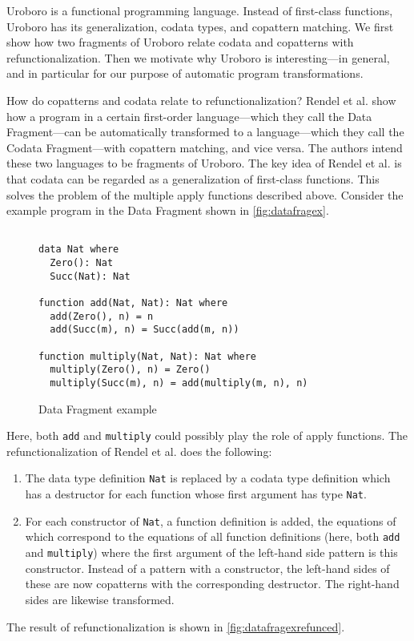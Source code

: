 Uroboro is a functional programming language. Instead of first-class functions, Uroboro has its generalization, codata types, and copattern matching. We first show how two fragments of Uroboro relate codata and copatterns with refunctionalization. Then we motivate why Uroboro is interesting---in general, and in particular for our purpose of automatic program transformations.

How do copatterns and codata relate to refunctionalization? Rendel et al.\cite{rendel15automatic} show how a program in a certain first-order language---which they call the Data Fragment---can be automatically transformed to a language---which they call the Codata Fragment---with copattern matching, and vice versa. The authors intend these two languages to be fragments of Uroboro. The key idea of Rendel et al. is that codata can be regarded as a generalization of first-class functions. This solves the problem of the multiple apply functions described above. Consider the example program in the Data Fragment shown in \autoref{fig:datafragex}.

\begin{figure}
\begin{lstlisting}

data Nat where
  Zero(): Nat
  Succ(Nat): Nat

function add(Nat, Nat): Nat where
  add(Zero(), n) = n
  add(Succ(m), n) = Succ(add(m, n))

function multiply(Nat, Nat): Nat where
  multiply(Zero(), n) = Zero()
  multiply(Succ(m), n) = add(multiply(m, n), n)

\end{lstlisting}
\caption{Data Fragment example}
\label{fig:datafragex}
\end{figure}

Here, both \texttt{add} and \texttt{multiply} could possibly play the role of apply functions. The refunctionalization of Rendel et al. does the following:
\begin{enumerate}
\item The data type definition \texttt{Nat} is replaced by a codata type definition which has a destructor for each function whose first argument has type \texttt{Nat}.
\item For each constructor of \texttt{Nat}, a function definition is added, the equations of which correspond to the equations of all function definitions (here, both \texttt{add} and \texttt{multiply}) where the first argument of the left-hand side pattern is this constructor. Instead of a pattern with a constructor, the left-hand sides of these are now copatterns with the corresponding destructor. The right-hand sides are likewise transformed.
\end{enumerate}
The result of refunctionalization is shown in \autoref{fig:datafragexrefunced}.

